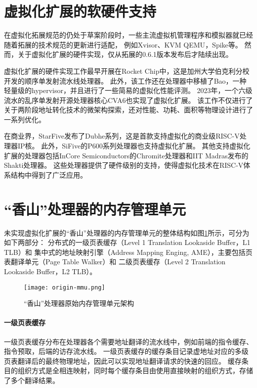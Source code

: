 \section{虚拟化扩展的软硬件支持}
在虚拟化拓展规范的仍处于草案阶段时，一些主流虚拟机管理程序和模拟器就已经随着拓展的技术规范的更新进行适配，
例如Xvisor\cite{micro2022xiangshan}、KVM\cite{kvm:H-ext}
QEMU\cite{qemu-riscv:H-ext}，Spike\cite{github:spike}等。
然而，关于虚拟化扩展的硬件实现，仅从拓展的0.6.1版本发布后才陆续出现。

虚拟化扩展的硬件实现工作最早开展在Rocket Chip\cite{itco2022rocket}中，这是加州大学伯克利分校开发的顺序单发射流水线处理器。
此外，该工作还在处理器中移植了Bao，一种轻量级的hypervisor\cite{ng-res2020bao}，并且进行了一些简易的虚拟化性能评测。
2023年，一个六级流水的乱序单发射开源处理器核心CVA6\cite{tvlsi2023cva6}也实现了虚拟化扩展。
该工作不仅进行了关于两阶段地址转化技术的微架构探索，还对性能、功耗、面积等物理设计进行了一系列优化。

在商业界，StarFive发布了Dubhe系列，这是首款支持虚拟化的商业级RISC-V处理器IP核。
此外，SiFive的P600系列处理器也支持虚拟化扩展。
其他支持虚拟化扩展的处理器包括InCore Semiconductors的Chromite处理器和IIT Madras发布的Shakti处理器。
这些处理器提供了硬件级别的支持，使得虚拟化技术在RISC-V体系结构中得到了广泛应用。

\section{“香山”处理器的内存管理单元}
未实现虚拟化扩展的“香山”处理器的内存管理单元的整体结构如图\ref{fig:origin-mmu}所示，可分为如下两部分：
分布式的一级页表缓存（Level 1 Translation Lookaside Buffer，L1 TLB）和
集中式的地址映射引擎（Address Mapping Enging, AME），主要包括页表翻译单元（Page Table Walker）和
二级页表缓存（Level 2 Translation Lookaside Buffer，L2 TLB）。

\begin{figure}[htbp]
    \centering
    \texttt{[image: origin-mmu.png]}
    \caption{“香山”处理器原始内存管理单元架构}
    \label{fig:origin-mmu}
\end{figure}

\paragraph{一级页表缓存} 一级页表缓存分布在处理器各个需要地址翻译的流水线中，例如前端的指令缓存、指令预取，后端的访存流水线。
一级页表缓存的缓存条目记录虚地址对应的多级页表翻译后的最终物理地址，因此可以实现地址翻译请求的快速的回应。
缓存条目的组织方式是全相连映射，同时每个缓存条目由使用直接映射的组织方式，存储了多个翻译结果。


